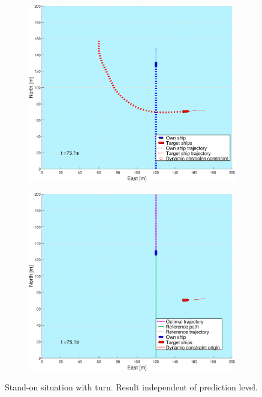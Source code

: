 \begin{figure}[ht!]
\begin{subfigure}[b]{0.494\textwidth}
        \subcaption{}
    \end{subfigure}
    \hfill
    \\
    \begin{subfigure}[b]{0.494\textwidth}
        \centering
        \includegraphics[width=\textwidth]{Images/Figures/sving_SO/_Simple_0fig1_time=75}
        \subcaption{}
    \end{subfigure}
    \hfill
    \begin{subfigure}[b]{0.494\textwidth}
        \centering
        \includegraphics[width=\textwidth]{Images/Figures/sving_SO/_Simple_0fig999_time=75}
        \subcaption{}
    \end{subfigure}
    \hfill
    \caption{Stand-on situation with turn. Result independent of prediction level.}
    \label{FIG: turn SO}
\end{figure}%
